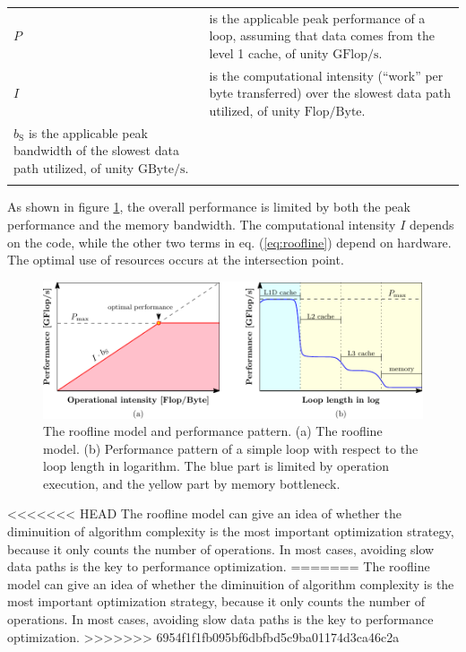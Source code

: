 \begin{tabular}{l>{\raggedright}p{}}
$P$ & is the applicable peak performance of a loop, assuming that data comes
from the level 1 cache, of unity $\mathrm{GFlop/s}$. \tabularnewline
$I$ & is the computational intensity (“work” per byte transferred) over
the slowest data path utilized, of unity $\mathrm{Flop/Byte}$. \tabularnewline
$b_{\mathrm{S}}$ is the applicable peak bandwidth of the slowest data path utilized,
of unity $\mathrm{GByte/s}$.\tabularnewline
 & \tabularnewline
\end{tabular}

As shown in figure \ref{fig:The-roofline-model}, the overall performance
is limited by both the peak performance and the memory bandwidth.
The computational intensity $I$ depends on the code, while the other
two terms in eq. (\ref{eq:roofline}) depend on hardware. The optimal
use of resources occurs at the intersection point.

\begin{figure}[h]
\begin{centering}
\includegraphics[width=1\columnwidth]{_figure/roofline}
\par\end{centering}

\caption [The roofline model and performance pattern]{The roofline model and performance pattern. (a) The roofline model.
(b) Performance pattern of a simple loop with respect to the loop
length in logarithm. The blue part is limited by operation execution,
and the yellow part by memory bottleneck. \label{fig:The-roofline-model}}
\end{figure}


<<<<<<< HEAD
The roofline model can give an idea of whether the diminuition of
algorithm complexity is the most important optimization strategy,
because it only counts the number of operations. In most cases,
avoiding slow data paths is the key to performance optimization.
=======
The roofline model can give an idea of whether the diminuition of algorithm
complexity is the most important optimization strategy, because it
only counts the number of operations. In most cases, avoiding
slow data paths is the key to performance optimization.
>>>>>>> 6954f1f1fb095bf6dbfbd5c9ba01174d3ca46c2a

